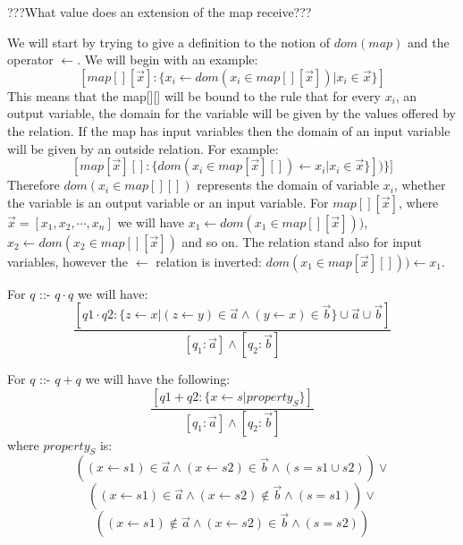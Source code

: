 \documentclass[12pt]{article}
\begin{document}
???What value does an extension of the map receive???

We will start by trying to give a definition to the notion of $dom(map)$ and the operator $\gets$. We will begin with an example: $$[map[][\vec x]: \{x_i \gets dom(x_i \in map[][\vec x])|x_i\in \vec x\}]$$This means that the map[][] will be bound to the rule that for every $x_i$, an output variable, the domain for the variable will be given by the values offered by the relation. If the map has input variables then the domain of an input variable will be given by an outside relation. For example: $$[map[\vec x][]:\{dom(x_i \in map[\vec x][])\gets x_i|x_i\in \vec x \}]) \}]$$Therefore $dom(x_i\in map[][])$ represents the domain of variable $x_i$, whether the variable is an output variable or an input variable. For $map[][\vec x]$, where $\vec x=[x_1,x_2,\cdots ,x_n]$ we will have $x_1 \gets dom(x_1 \in map[][\vec x]))$, $x_2 \gets dom(x_2 \in map[][\vec x])$ and so on. The relation stand also for input variables, however the $\gets$ relation is inverted: $dom(x_1 \in map[\vec x][]))\gets x_1$.

For $q$ ::- $q \cdot q$ we will have: $$\frac{[q1\cdot q2: \{ z \gets x | (z \gets y) \in \vec a \wedge (y \gets x) \in \vec b\} \cup \vec a \cup \vec b ]}{[q_1 : \vec a] \wedge [q_2 : \vec b]}$$

For $q$ ::- $q+q$ we will have the following: $$\frac{[q1+ q2: \{x \gets s | property_{S} \}]}{[q_1 : \vec a] \wedge [q_2 : \vec b]} $$ where $property_{S}$ is: $$((x \gets s1)\in \vec a\wedge (x\gets s2)\in \vec b \wedge (s=s1\cup s2))\vee$$$$ ((x\gets s1)\in \vec a\wedge (x\gets s2)\notin \vec b\wedge (s=s1))\vee$$$$((x\gets s1)\notin \vec a\wedge (x\gets s2)\in \vec b\wedge (s=s2))$$
\end{document}
